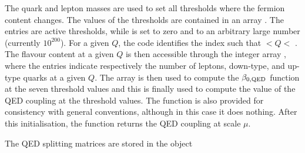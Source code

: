 % 
%

The quark and lepton masses are used to set all thresholds where the
fermion content changes.
%
The values of the thresholds are contained in an array
.
%
The  entries are active thresholds, while
 is set to zero and  to an
arbitrary large number (currently $10^{200}$).
%
For a given $Q$, the code identifies the index  such that
$<Q<$ .
%
The flavour content at a given $Q$ is then accessible through the
integer array , where the
 entries indicate respectively the number of
leptons, down-type, and up-type quarks at a given $Q$.
%
%
The  array is then used to compute the
$\beta_{0,\rm QED}$ function  at the
seven threshold values and this is finally used to compute the value
of the QED coupling  at the
threshold values.
%
The function  is also provided for
consistency with general \hoppet conventions, although in this case it does nothing.
%
After this initialisation, the function  returns the QED coupling at
scale $\mu$.


The QED splitting matrices are stored in the object

